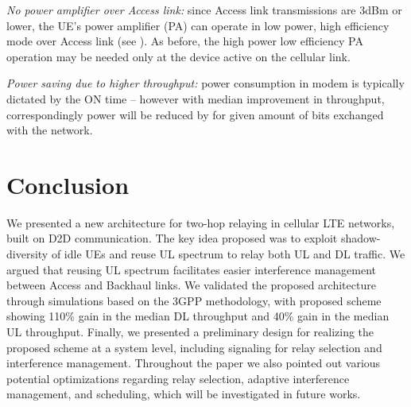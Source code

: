 \documentclass[journal]{IEEEtran}
\begin{document}
{\em No power amplifier over Access link:} since Access link transmissions are 3dBm or lower, the UE's power amplifier (PA) can operate in low power, high efficiency mode over Access link (see \cite[Fig.~7]{JensenLauridsen12}). As before, the high power low efficiency PA operation may be needed only at the device active on the cellular link.

{\em Power saving due to higher throughput:} power consumption in modem is typically dictated by the ON time -- however with  median improvement in throughput, correspondingly power will be reduced by  for given amount of bits exchanged with the network.

\section{Conclusion}
\label{sec:conclusion}
We presented a new architecture for two-hop relaying in cellular LTE networks, built on D2D communication.
The key idea proposed was to exploit shadow-diversity of idle UEs and reuse UL spectrum to relay both UL and DL traffic.
We argued that reusing UL spectrum facilitates easier interference management between Access and Backhaul links.
We validated the proposed architecture through simulations based on the 3GPP methodology, with proposed scheme showing 110\% gain in the median DL throughput and 40\% gain in the median UL throughput.
Finally, we presented a preliminary design for realizing the proposed scheme at a system level, including signaling for relay selection and interference management.
Throughout the paper we also pointed out various potential optimizations regarding relay selection, adaptive interference management, and scheduling, which will be investigated in future works.
\end{document}

